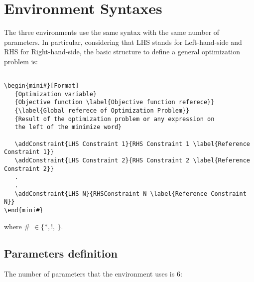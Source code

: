 \documentclass[]{report}
\begin{document}
\section{Environment Syntaxes}
The three environments use the same syntax with the same number of parameters. In particular, considering that LHS stands for Left-hand-side and RHS for Right-hand-side, the basic structure to define a general optimization problem is:
\begin{verbatim}

\begin{mini#}[Format]
   {Optimization variable}
   {Objective function \label{Objective function referece}}
   {\label{Global referece of Optimization Problem}}  
   {Result of the optimization problem or any expression on 
   the left of the minimize word}

   \addConstraint{LHS Constraint 1}{RHS Constraint 1 \label{Reference Constraint 1}}
   \addConstraint{LHS Constraint 2}{RHS Constraint 2 \label{Reference Constraint 2}}
   .
   .
   \addConstraint{LHS N}{RHSConstraint N \label{Reference Constraint N}}
\end{mini#}
\end{verbatim}

\noindent where \# $\in \{*, !, ~ \}$.
\subsection{Parameters definition}
The number of parameters that the environment uses is 6:
\end{document}
